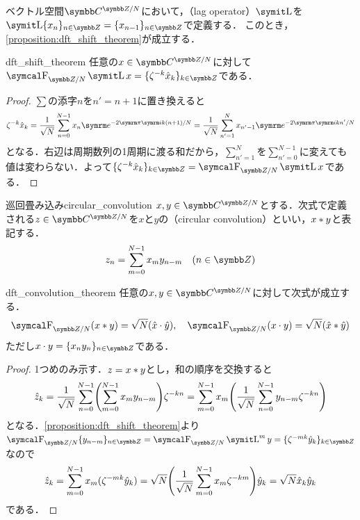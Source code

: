 \documentclass[../../main]{subfiles}
\begin{document}
ベクトル空間\(\cycles{\numset{C}}{N}\)において，（lag operator）\(\lagop\)を\(\lagop\seq{x_n}_{n\in\numset{Z}}=\seq{x_{n-1}}_{n\in\numset{Z}}\)で定義する．
このとき，\cref{proposition:dft_shift_theorem}が成立する．

\begin{proposition}{}{dft_shift_theorem}
  任意の\(x\in\cycles{\numset{C}}{N}\)に対して\(\dft{N}\lagop x=\seq{\zeta^{-k}\hat{x}_k}_{k\in\numset{Z}}\)である．
\end{proposition}

\begin{proof}
  \(\sum\)の添字\(n\)を\(n'=n+1\)に置き換えると
  \[
    \zeta^{-k}\hat{x}_k = \frac{1}{\sqrt{N}}\sum_{n=0}^{N-1}x_n\napr^{-2\krez\iuni k(n+1)/N}
    = \frac{1}{\sqrt{N}}\sum_{n'=1}^Nx_{n'-1}\napr^{-2\krez\iuni kn'/N}
  \]
  となる．右辺は周期数列の1周期に渡る和だから，\(\sum_{n'=1}^N\)を\(\sum_{n'=0}^{N-1}\)に変えても値は変わらない．よって\(\seq{\zeta^{-k}\hat{x}_k}_{k\in\numset{Z}}=\dft{N}\lagop x\)である．
\end{proof}

\begin{definition}{巡回畳み込み}{circular_convolution}
  \(x,y\in\cycles{\numset{C}}{N}\)とする．次式で定義される\(z\in\cycles{\numset{C}}{N}\)を\(x\)と\(y\)の（circular convolution）といい，\(x\ast y\)と表記する．
  \[
    z_n = \sum_{m=0}^{N-1}x_my_{n-m}\quad(n\in\numset{Z})
  \]
\end{definition}

\begin{proposition}{}{dft_convolution_theorem}
  任意の\(x,y\in\cycles{\numset{C}}{N}\)に対して次式が成立する．
  \[
    \dft{N}(x\circconv y) = \sqrt{N}(\hat{x}\cdot\hat{y}),
    \quad\dft{N}(x\cdot y) = \sqrt{N}(\hat{x}\circconv\hat{y})
  \]
  ただし\(x\cdot y=\seq{x_ny_n}_{n\in\numset{Z}}\)である．
\end{proposition}

\begin{proof}
  1つめのみ示す．\(z=x\ast y\)とし，和の順序を交換すると
  \[
    \hat{z}_k = \frac{1}{\sqrt{N}}\sum_{n=0}^{N-1}\pqty*{\sum_{m=0}^{N-1}x_my_{n-m}}\zeta^{-kn}
    = \sum_{m=0}^{N-1}x_m\pqty*{\frac{1}{\sqrt{N}}\sum_{n=0}^{N-1}y_{n-m}\zeta^{-kn}}
  \]
  となる．\cref{proposition:dft_shift_theorem}より\(\dft{N}\seq{y_{n-m}}_{n\in\numset{Z}}=\dft{N}\lagop^my=\seq{\zeta^{-mk}\hat{y}_k}_{k\in\numset{Z}}\)なので
  \[
    \hat{z}_k = \sum_{m=0}^{N-1}x_m(\zeta^{-mk}\hat{y}_k)
    = \sqrt{N}\pqty*{\frac{1}{\sqrt{N}}\sum_{m=0}^{N-1}x_m\zeta^{-km}}\hat{y}_k
    = \sqrt{N}\hat{x}_k\hat{y}_k
  \]
  である．
\end{proof}
\end{document}
